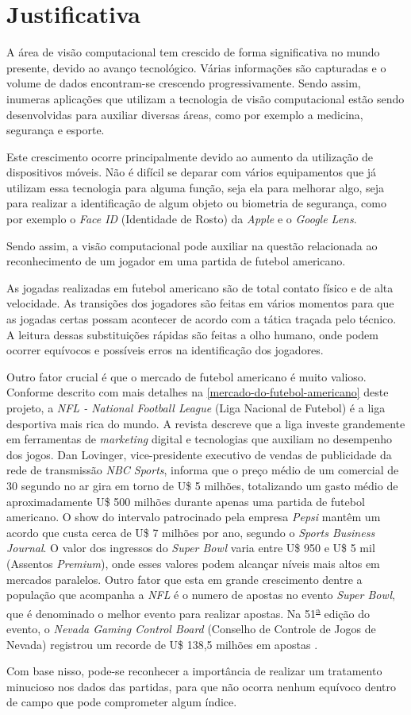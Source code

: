 \section{\textbf{Justificativa}}

A área de visão computacional tem crescido de forma significativa no mundo presente, devido ao avanço tecnológico. Várias informações são capturadas e o volume de dados encontram-se crescendo progressivamente. Sendo assim, inumeras aplicações que utilizam a tecnologia de visão computacional estão sendo desenvolvidas para auxiliar diversas áreas, como por exemplo a medicina, segurança e esporte.

Este crescimento ocorre principalmente devido ao aumento da utilização de dispositivos móveis. Não é difícil se deparar com vários equipamentos que já utilizam essa tecnologia para alguma função, seja ela para melhorar algo, seja para realizar a identificação de algum objeto ou biometria de segurança, como por exemplo o \textit{Face ID} (Identidade de Rosto) da \textit{Apple} e o \textit{Google Lens}.

Sendo assim, a visão computacional pode auxiliar na questão relacionada ao reconhecimento de um jogador em uma partida de futebol americano.

As jogadas realizadas em futebol americano são de total contato físico e de alta velocidade. As transições dos jogadores são feitas em vários momentos para que as jogadas certas possam acontecer de acordo com a tática traçada pelo técnico. A leitura dessas substituições rápidas são feitas a olho humano, onde podem ocorrer equívocos e possíveis erros na identificação dos jogadores.

Outro fator crucial é que o mercado de futebol americano é muito valioso. Conforme descrito com mais detalhes na \autoref{mercado-do-futebol-americano} deste projeto, a \textit{NFL - National Football League} (Liga Nacional de Futebol) é a liga desportiva mais rica do mundo. A revista  descreve que a liga investe grandemente em ferramentas de \textit{marketing} digital e tecnologias que auxiliam no desempenho dos jogos. Dan Lovinger, vice-presidente executivo de vendas de publicidade da rede de transmissão \textit{NBC Sports}, informa que o preço médio de um comercial de 30 segundo no ar gira em torno de U\$ 5 milhões, totalizando um gasto médio de aproximadamente U\$ 500 milhões durante apenas uma partida de futebol americano. O show do intervalo patrocinado pela empresa \textit{Pepsi} mantêm um acordo que custa cerca de U\$ 7 milhões por ano, segundo o \textit{Sports Business Journal}. O valor dos ingressos do \textit{Super Bowl} varia entre U\$ 950 e U\$ 5 mil (Assentos \textit{Premium}), onde esses valores podem alcançar níveis mais altos em mercados paralelos. Outro fator que esta em grande crescimento dentre a população que acompanha a \textit{NFL} é o numero de apostas no evento \textit{Super Bowl}, que é denominado o melhor evento para realizar apostas. Na 51\textsuperscript{\underline{a}} edição do evento, o \textit{Nevada Gaming Control Board} (Conselho de Controle de Jogos de Nevada) registrou um recorde de U\$ 138,5 milhões em apostas \cite{FORBES2018}.

Com base nisso, pode-se reconhecer a importância de realizar um tratamento minucioso nos dados das partidas, para que não ocorra nenhum equívoco dentro de campo que pode comprometer algum índice.